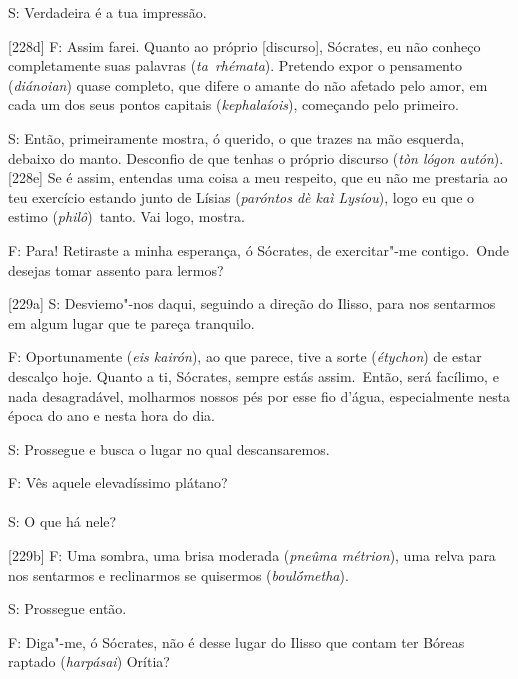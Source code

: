  

S: Verdadeira é a tua impressão.

 

[228d] F: Assim farei. Quanto ao próprio [discurso], Sócrates,
eu não conheço completamente suas palavras (\emph{ta}~\emph{rhémata}).
Pretendo expor o pensamento (\emph{diánoian}) quase completo, que difere
o amante do não afetado pelo amor, em cada um dos seus pontos capitais
(\emph{kephalaíois}), começando pelo primeiro.

 

S: Então, primeiramente mostra, ó querido, o que trazes na mão esquerda,
debaixo do manto. Desconfio de que tenhas o próprio discurso (\emph{tòn
lógon autón}). [228e] Se é assim, entendas uma coisa a meu respeito,
que eu não me prestaria ao teu exercício estando junto de Lísias
(\emph{paróntos dè kaì Lysíou}), logo eu que o estimo
(\emph{philô})~tanto. Vai logo, mostra.

 

F: Para! Retiraste a minha esperança, ó Sócrates, de exercitar"-me
contigo.~Onde desejas tomar assento para lermos?

 

[229a] S: Desviemo"-nos daqui, seguindo a direção do Ilisso, para nos
sentarmos em algum lugar que te pareça tranquilo.

 

F: Oportunamente (\emph{eis kairón}), ao que parece, tive a sorte
(\emph{étychon}) de estar descalço hoje. Quanto a ti, Sócrates, sempre
estás assim.~Então, será facílimo, e nada desagradável, molharmos nossos
pés por esse fio d'água, especialmente nesta época do ano e nesta hora
do dia.

 

S: Prossegue e busca o lugar no qual descansaremos.

 

F: Vês aquele elevadíssimo plátano?\\\\

S: O que há nele?

 

[229b] F: Uma sombra, uma brisa moderada (\emph{pneûma métrion}),
uma relva para nos sentarmos e reclinarmos se quisermos
(\emph{boulṓmetha}).

 

S: Prossegue então.

 

F: Diga"-me, ó Sócrates, não é desse lugar do Ilisso que contam ter
Bóreas raptado (\emph{harpásai}) Orítia?

